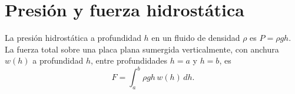 

\section{Presión y fuerza hidrostática}

\begin{definition}
La presión hidrostática a profundidad $h$ en un fluido de densidad $\rho$
es $P=\rho g h$. La fuerza total sobre una placa plana sumergida
verticalmente, con anchura $w(h)$ a profundidad $h$, entre profundidades
$h=a$ y $h=b$, es
\[
  F = \int_a^b\rho g h\,w(h)\,dh.
\]
\end{definition}


